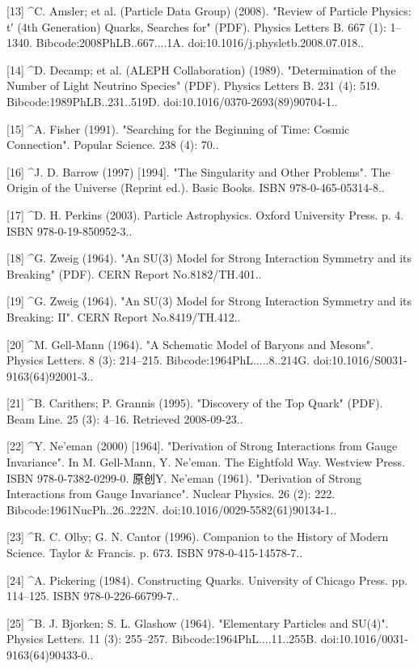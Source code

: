 [13]
^C. Amsler; et al. (Particle Data Group) (2008). "Review of Particle Physics: t′ (4th Generation) Quarks, Searches for" (PDF). Physics Letters B. 667 (1): 1–1340. Bibcode:2008PhLB..667....1A. doi:10.1016/j.physletb.2008.07.018..

[14]
^D. Decamp; et al. (ALEPH Collaboration) (1989). "Determination of the Number of Light Neutrino Species" (PDF). Physics Letters B. 231 (4): 519. Bibcode:1989PhLB..231..519D. doi:10.1016/0370-2693(89)90704-1..

[15]
^A. Fisher (1991). "Searching for the Beginning of Time: Cosmic Connection". Popular Science. 238 (4): 70..

[16]
^J. D. Barrow (1997) [1994]. "The Singularity and Other Problems". The Origin of the Universe (Reprint ed.). Basic Books. ISBN 978-0-465-05314-8..

[17]
^D. H. Perkins (2003). Particle Astrophysics. Oxford University Press. p. 4. ISBN 978-0-19-850952-3..

[18]
^G. Zweig (1964). "An SU(3) Model for Strong Interaction Symmetry and its Breaking" (PDF). CERN Report No.8182/TH.401..

[19]
^G. Zweig (1964). "An SU(3) Model for Strong Interaction Symmetry and its Breaking: II". CERN Report No.8419/TH.412..

[20]
^M. Gell-Mann (1964). "A Schematic Model of Baryons and Mesons". Physics Letters. 8 (3): 214–215. Bibcode:1964PhL.....8..214G. doi:10.1016/S0031-9163(64)92001-3..

[21]
^B. Carithers; P. Grannis (1995). "Discovery of the Top Quark" (PDF). Beam Line. 25 (3): 4–16. Retrieved 2008-09-23..

[22]
^Y. Ne'eman (2000) [1964]. "Derivation of Strong Interactions from Gauge Invariance". In M. Gell-Mann, Y. Ne'eman. The Eightfold Way. Westview Press. ISBN 978-0-7382-0299-0. 原创Y. Ne'eman (1961). "Derivation of Strong Interactions from Gauge Invariance". Nuclear Physics. 26 (2): 222. Bibcode:1961NucPh..26..222N. doi:10.1016/0029-5582(61)90134-1..

[23]
^R. C. Olby; G. N. Cantor (1996). Companion to the History of Modern Science. Taylor & Francis. p. 673. ISBN 978-0-415-14578-7..

[24]
^A. Pickering (1984). Constructing Quarks. University of Chicago Press. pp. 114–125. ISBN 978-0-226-66799-7..

[25]
^B. J. Bjorken; S. L. Glashow (1964). "Elementary Particles and SU(4)". Physics Letters. 11 (3): 255–257. Bibcode:1964PhL....11..255B. doi:10.1016/0031-9163(64)90433-0..


